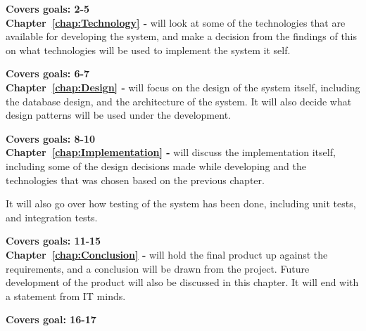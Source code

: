 \textbf{Covers goals: 2-5}\\

\textbf{Chapter~\ref{chap:Technology} - } will look at
some of the technologies that are available for developing the system, and make
a decision from the findings of this on what technologies will be used to
implement the system it self. 

\textbf{Covers goals: 6-7}\\

\textbf{Chapter~\ref{chap:Design} - } will focus on the
design of the system itself, including the database design, and the architecture
of the system. It will also decide what design patterns will be used under the
development. 

\textbf{Covers goals: 8-10}\\

\textbf{Chapter~\ref{chap:Implementation} - } will
discuss the implementation itself, including some of the design decisions made
while developing and the technologies that was chosen based on the previous
chapter. 

It will also go over how testing of the system has been done, including unit
tests, and integration tests. 

\textbf{Covers goals: 11-15}\\


\textbf{Chapter~\ref{chap:Conclusion} - } will hold the
final product up against the requirements, and a conclusion will be drawn from
the project. Future development of the product will also be discussed in this
chapter. It will end with a statement from IT minds.

\textbf{Covers goal: 16-17}
